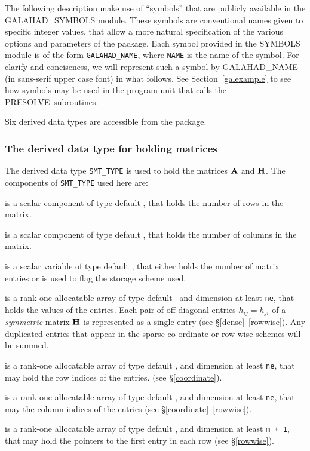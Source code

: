 \documentclass{galahad}
\newcommand{\packagename}{PRESOLVE}
\newcommand{\sym}{\sf\small}
\begin{document}
\galsymbols

The following description make use of ``symbols'' that are publicly available
in the GALAHAD\_SYMBOLS module. These symbols are conventional names given to
specific integer values, that allow a more natural specification of the
various options and parameters of the package.  Each symbol provided in the
SYMBOLS module is of the form {\tt GALAHAD\_NAME}, where {\tt NAME} is the name
of the symbol.  For clarify and conciseness, we will represent such a symbol
by {\sym GALAHAD\_NAME} (in sans-serif upper case font) in what follows. See
Section~\ref{galexample} to see how symbols may be used in the program unit
that calls the \packagename\ subroutines.


\galtypes

Six derived data types are accessible from the package.


\subsubsection{The derived data type for holding matrices}\label{typesmt}
The derived data type {\tt SMT\_TYPE} is used to hold the matrices ${\mathbf{A}}$
and ${\mathbf{H}}$. The components of {\tt SMT\_TYPE} used here are:

\begin{description}

 is a scalar component of type default \integer, 
that holds the number of rows in the matrix. 
 
 is a scalar component of type default \integer, 
that holds the number of columns in the matrix. 
 
 is a scalar variable of type default \integer, that either 
holds the number of matrix entries or is used to flag the storage scheme
used. 

 is a rank-one allocatable array of type default \realdp\, 
and dimension at least {\tt ne}, that holds the values of the entries. 
Each pair of off-diagonal entries $h_{ij} = h_{ji}$ of a {\em symmetric}
matrix ${\mathbf{H}}$ is represented as a single entry 
(see \S\ref{dense}--\ref{rowwise}).
Any duplicated entries that appear in the sparse 
co-ordinate or row-wise schemes will be summed. 

 is a rank-one allocatable array of type default \integer, 
and dimension at least {\tt ne}, that may hold the row indices of the entries. 
(see \S\ref{coordinate}).

 is a rank-one allocatable array of type default \integer, 
and dimension at least {\tt ne}, that may the column indices of the entries
(see \S\ref{coordinate}--\ref{rowwise}).

 is a rank-one allocatable array of type default \integer, 
and dimension at least {\tt m + 1}, that may hold the pointers to
the first entry in each row (see \S\ref{rowwise}).

\end{description}
\end{document}
